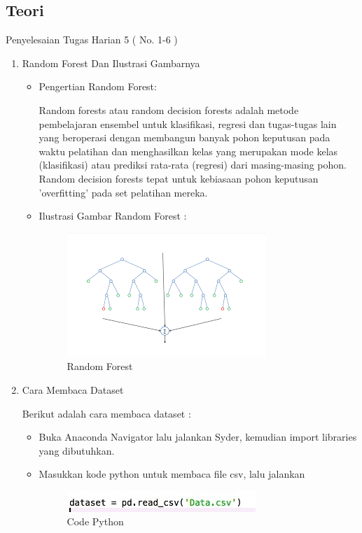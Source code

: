 \subsection{Teori}
Penyelesaian Tugas Harian 5 ( No. 1-6 )
\begin{enumerate}
\item Random Forest Dan Ilustrasi Gambarnya
\begin{itemize}
\item Pengertian Random Forest:

Random forests atau random decision forests adalah metode pembelajaran ensembel untuk klasifikasi, regresi dan tugas-tugas lain yang beroperasi dengan membangun banyak pohon keputusan pada waktu pelatihan dan menghasilkan kelas yang merupakan mode kelas (klasifikasi) atau prediksi rata-rata (regresi) dari masing-masing pohon. Random decision forests tepat untuk kebiasaan pohon keputusan 'overfitting' pada set pelatihan mereka.

\item Ilustrasi Gambar Random Forest :

\begin{figure}[ht]
\centering
\includegraphics[scale=0.5]{figures/Chapter3AnnisaFathoroni1.png}
\caption{Random Forest}
\label{contoh}
\end{figure}

\end{itemize}

\item Cara Membaca Dataset

Berikut adalah cara membaca dataset :
\begin{itemize}
\item Buka Anaconda Navigator lalu jalankan Syder, kemudian import libraries yang dibutuhkan.
\item Masukkan kode python untuk membaca file csv, lalu jalankan

\begin{figure}[ht]
\centering
\includegraphics[scale=0.8]{figures/Chapter3AnnisaFathoroni5.jpeg}
\caption{Code Python}
\label{contoh}
\end{figure}


\end{itemize}
\end{enumerate}
